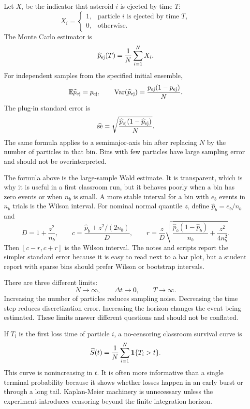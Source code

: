 Let \(X_i\) be the indicator that asteroid \(i\) is ejected by time \(T\):
\[
        X_i=
        \begin{cases}
        1,&\text{particle \(i\) is ejected by time \(T\)},\\
        0,&\text{otherwise}.
        \end{cases}
\]
The Monte Carlo estimator is
\[
        \widehat p_{\rm ej}(T)=\frac{1}{N}\sum_{i=1}^N X_i .
\]
For independent samples from the specified initial ensemble,
\[
        \mathbb{E}\widehat p_{\rm ej}=p_{\rm ej},\qquad
        \operatorname{Var}(\widehat p_{\rm ej})
        =
        \frac{p_{\rm ej}(1-p_{\rm ej})}{N}.
\]
The plug-in standard error is
\[
        \widehat{\operatorname{se}}
        =
        \sqrt{\frac{\widehat p_{\rm ej}(1-\widehat p_{\rm ej})}{N}} .
\]
The same formula applies to a semimajor-axis bin after replacing \(N\) by the
number of particles in that bin.  Bins with few particles have large sampling
error and should not be overinterpreted.

The formula above is the large-sample Wald estimate.  It is transparent, which
is why it is useful in a first classroom run, but it behaves poorly when a bin
has zero events or when \(n_b\) is small.  A more stable interval for a bin
with \(e_b\) events in \(n_b\) trials is the Wilson interval.  For nominal
normal quantile \(z\), define \(\widehat p_b=e_b/n_b\) and
\[
  D=1+\frac{z^2}{n_b},
  \qquad
  c=\frac{\widehat p_b+z^2/(2n_b)}{D},
  \qquad
  r=\frac{z}{D}
  \sqrt{\frac{\widehat p_b(1-\widehat p_b)}{n_b}
  +\frac{z^2}{4n_b^2}} .
\]
Then \([c-r,c+r]\) is the Wilson interval.  The notes and scripts report the
simpler standard error because it is easy to read next to a bar plot, but a
student report with sparse bins should prefer Wilson or bootstrap intervals.

There are three different limits:
\[
        N\to\infty,\qquad
        \Delta t\to0,\qquad
        T\to\infty .
\]
Increasing the number of particles reduces sampling noise.  Decreasing the
time step reduces discretization error.  Increasing the horizon changes the
event being estimated.  These limits answer different questions and should not
be conflated.

If \(T_i\) is the first loss time of particle \(i\), a no-censoring classroom
survival curve is
\[
  \widehat S(t)
  =
  \frac{1}{N}\sum_{i=1}^N{\bf 1}\{T_i>t\}.
\]
This curve is nonincreasing in \(t\).  It is often more informative than a
single terminal probability because it shows whether losses happen in an early
burst or through a long tail.  Kaplan-Meier machinery is unnecessary unless the
experiment introduces censoring beyond the finite integration horizon.

